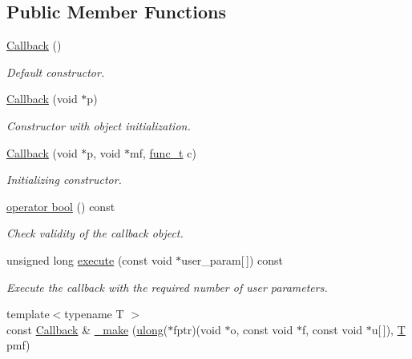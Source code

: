 \subsection*{Public Member Functions}
\begin{DoxyCompactItemize}
\item 
\hyperlink{class_d_d4hep_1_1_callback_af29b371d4eb53f3e27df8c3250899950}{Callback} ()
\begin{DoxyCompactList}\small\item\em Default constructor. \item\end{DoxyCompactList}\item 
\hyperlink{class_d_d4hep_1_1_callback_a11bd26d9c2634ea669f13d30d1462f8e}{Callback} (void $\ast$p)
\begin{DoxyCompactList}\small\item\em Constructor with object initialization. \item\end{DoxyCompactList}\item 
\hyperlink{class_d_d4hep_1_1_callback_ad9377008515da7c31829f8f1c77c0be8}{Callback} (void $\ast$p, void $\ast$mf, \hyperlink{class_d_d4hep_1_1_callback_a3b7cb36fa166495663680601ba5d7fe0}{func\_\-t} c)
\begin{DoxyCompactList}\small\item\em Initializing constructor. \item\end{DoxyCompactList}\item 
\hyperlink{class_d_d4hep_1_1_callback_ad09cdf0e5d4dfe2a0f9a2f924ae5b930}{operator bool} () const 
\begin{DoxyCompactList}\small\item\em Check validity of the callback object. \item\end{DoxyCompactList}\item 
unsigned long \hyperlink{class_d_d4hep_1_1_callback_aa2f121c71eaba5c384fe57aade6ebda9}{execute} (const void $\ast$user\_\-param\mbox{[}$\,$\mbox{]}) const 
\begin{DoxyCompactList}\small\item\em Execute the callback with the required number of user parameters. \item\end{DoxyCompactList}\item 
{\footnotesize template$<$typename T $>$ }\\const \hyperlink{class_d_d4hep_1_1_callback}{Callback} \& \hyperlink{class_d_d4hep_1_1_callback_af46adbf158456243c857aadf77295387}{\_\-make} (\hyperlink{class_d_d4hep_1_1_callback_ac676aa0685e2ba51bac69c33f8066431}{ulong}($\ast$fptr)(void $\ast$o, const void $\ast$f, const void $\ast$u\mbox{[}$\,$\mbox{]}), \hyperlink{class_t}{T} pmf)

\end{DoxyCompactItemize}
